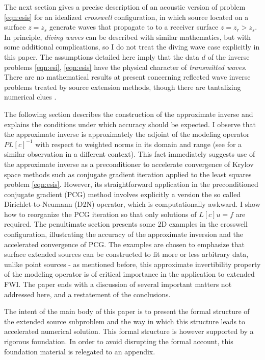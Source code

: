 The next section gives a precise description of an acoustic version of problem \ref{eqn:esis} for an idealized {\em crosswell} configuration, in which source located on a surface $z=z_s$ generate waves that propagate to to a receiver surface $z=z_r > z_s$. In principle, {\em diving waves} can be described with similar mathematics, but with some additional complications, so I do not treat the diving wave case explicitly in this paper. The assumptions detailed here imply that the data $d$ of the inverse problems \ref{eqn:esi}, \ref{eqn:esis} have the physical character of {\em transmitted waves}. There are no mathematical results at present concerning reflected wave inverse problems treated by source extension methods, though there are tantalizing numerical clues \cite[]{LeeuwenHerrmannWRI:13,Warner:14,Warner:16,LeeuwenHerrmann:16,HuangSymes:Geo17,HuangSymes:Geo18a,HuangSymes:Geo18b}.

The following section describes the construction of the approximate
inverse and explains the conditions under which accuracy should be expected. I observe that the approximate inverse is approximately the adjoint of the modeling operator $PL[c]^{-1}$ with respect to weighted norms in its domain and range (see \cite{HouSymes:15} for a similar observation in a different context). This fact immediately suggests use of the approximate inverse as a preconditioner to accelerate convergence of Krylov space methods such as conjugate gradient iteration applied to the least squares problem \ref{eqn:esis}. However, its straightforward application in the preconditioned conjugate gradient (PCG) method \cite[]{Golub:2012} involves explicitly a version the so called Dirichlet-to-Neumann (D2N) operator, which is computationally awkward. I show how to reorganize the PCG iteration so that only solutions of $L[c]u=f$ are required. The penultimate section presents some 2D examples in the crosswell configuration, illustrating the accuracy of the approximate inversion and the accelerated convergence of PCG. The examples are chosen to emphasize that surface extended sources can be constructed to fit more or less arbitrary data, unlike point sources - as mentioned before, this approximate invertibility property of the modeling operator is of critical importance in the application to extended FWI. The paper ends with a discussion of several important matters not addressed here, and a restatement of the conclusions.

The intent of the main body of this paper is to present the formal structure of the extended source subproblem and the way in which this structure leads to accelerated numerical solution. This formal structure is however supported by a rigorous foundation. In order to avoid disrupting the formal account, this foundation material is relegated to an appendix.





